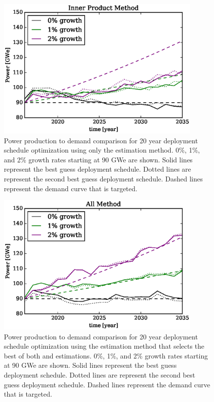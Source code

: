 \begin{figure}[htb]
\centering
\includegraphics[width=0.9\textwidth]{demand-product-inner-product.eps}
\caption{Power production to demand comparison for 20 year deployment 
schedule optimization using only the \innerprod estimation method.
0\%, 1\%, and 2\% growth rates starting at 90 GWe are shown. Solid lines 
represent the best guess deployment schedule.  Dotted lines are represent 
the second best guess deployment schedule. Dashed lines represent the 
demand curve that is targeted.
}
\label{demand-product-inner-product}
\end{figure}

\begin{figure}[htb]
\centering
\includegraphics[width=0.9\textwidth]{demand-product-all.eps}
\caption{Power production to demand comparison for 20 year deployment 
schedule optimization using the \allflag estimation method that selects the 
best of both \stochastic and \innerprod estimations.
0\%, 1\%, and 2\% growth rates starting at 90 GWe are shown. Solid lines 
represent the best guess deployment schedule.  Dotted lines are represent 
the second best guess deployment schedule. Dashed lines represent the 
demand curve that is targeted.}
\label{demand-product-all}
\end{figure}

